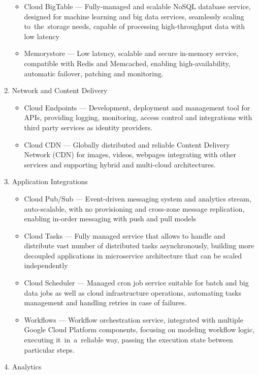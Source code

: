 \begin{enumerate}
\begin{itemize}
       \item Cloud BigTable --- Fully-managed and scalable NoSQL database service, designed for machine learning and big data services, seamlessly scaling to~the~storage needs, capable of processing high-throughput data with low latency
       \item Memorystore --- Low latency, scalable and secure in-memory service, compatible with Redis and Memcached, enabling high-availability, automatic failover, patching and monitoring.
   \end{itemize}
   \item Network and Content Delivery
   \begin{itemize}
       \item Cloud Endpoints --- Development, deployment and management tool for APIs, providing logging, monitoring, access control and integrations with third party services as identity providers.
       \item Cloud CDN --- Globally distributed and reliable Content Delivery Network (CDN) for images, videos, webpages integrating with other services and supporting hybrid and multi-cloud architectures.
   \end{itemize}
   \item Application Integrations
   \begin{itemize}
       \item Cloud Pub/Sub --- Event-driven messaging system and analytics stream, auto-scalable, with no provisioning and cross-zone message replication, enabling in-order messaging with push and pull models
       \item Cloud Tasks --- Fully managed service that allows to handle and distribute vast number of distributed tasks asynchronously, building more decoupled applications in microservice architecture that can be scaled independently
       \item Cloud Scheduler --- Managed cron job service suitable for batch and big data jobs as well as cloud infrastructure operations, automating tasks management and handling retries in case of failures.
       \item Workflows --- Workflow orchestration service, integrated with multiple Google Cloud Platform components, focusing on modeling workflow logic, executing it~in~a~reliable way, passing the execution state between particular steps.
   \end{itemize}
   \item Analytics
   \begin{itemize}

\end{itemize}
\end{enumerate}
